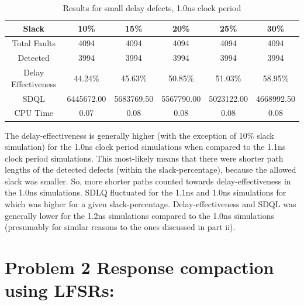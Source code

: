 \documentclass[letterpaper]{article} %
\begin{document}
\begin{table}[ht]
\centering
\begin{tabular}{|c|c|c|c|c|c|}
\hline
Slack               & 10\%            & 15\%            & 20\%            & 25\%            & 30\%            \\ \hline
Total Faults        & 4094            & 4094            & 4094            & 4094            & 4094            \\ \hline
Detected            & 3994            & 3994            & 3994            & 3994            & 3994            \\ \hline
Delay Effectiveness & 44.24\% & 45.63\% & 50.85\% & 51.03\% & 58.95\% \\ \hline
SDQL                & 6445672.00      & 5683769.50      & 5567790.00      & 5023122.00      & 4668992.50      \\ \hline
CPU Time            & 0.07            & 0.08            & 0.08            & 0.08            & 0.08            \\ \hline
\end{tabular}
\caption{Results for small delay defects, 1.0ns clock period}
\end{table}
The delay-effectiveness is generally higher (with the exception of 10\% slack simulation) for the 1.0ns clock period simulations when compared to the 1.1ns clock period simulations. This most-likely means that there were shorter path lengths of the detected defects (within the slack-percentage), because the allowed slack was smaller. So, more shorter paths counted towards delay-effectiveness in the 1.0ns simulations. SDLQ fluctuated for the 1.1ns and 1.0ns simulations for which was higher for a given slack-percentage. Delay-effectiveness and SDQL was generally lower for the 1.2ns simulations compared to the 1.0ns simulations (presumably for similar reasons to the ones discussed in part ii).

\newpage

\section*{Problem 2 {\small Response compaction using LFSRs:}}
\end{document}
